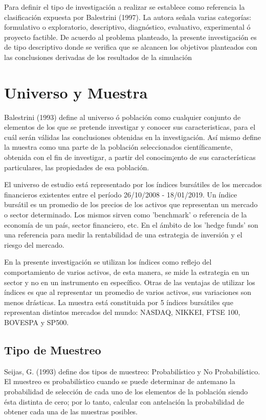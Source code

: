 \documentclass[a4paper,12pt]{Latex/Classes/PhDthesisPSnPDF}
\begin{document}
Para definir el tipo de investigación a realizar se establece como referencia la clasificación expuesta por Balestrini (1997). La autora señala varias categorías: formulativo o exploratorio, descriptivo, diagnóstico, evaluativo, experimental ó proyecto factible. De acuerdo al problema planteado, la presente investigación es de tipo descriptivo donde se verifica que se alcancen los objetivos planteados con las conclusiones derivadas de los resultados de la simulación

\section{Universo y Muestra}

Balestrini (1993) define al universo ó población como cualquier conjunto de elementos de los que se pretende investigar y conocer sus caracteristicas, para el cuál serán válidas las conclusiones obtenidas en la investigación. Así mismo define la muestra como una parte de la población seleccionados científicamente, obtenida con el fin de investigar, a partir del conocim¡ento de sus características particulares, las propiedades de esa población.

El universo de estudio está representado por los índices bursátiles de los mercados financieros existentes entre el período 26/10/2008 - 18/01/2019. Un índice bursátil es un promedio de los precios de los activos que representan un mercado o sector determinado. Los mismos sirven como 'benchmark' o referencia de la economía de un país, sector financiero, etc. En el ámbito de los 'hedge funds' son una referencia para medir la rentabilidad de una estrategia de inversión y el riesgo del mercado.

En la presente investigación se utilizan los índices como reflejo del comportamiento de varios activos, de esta manera, se mide la estrategia en un sector y no en un instrumento en específico. Otras de las ventajas de utilizar los índices es que al representar un promedio de varios activos, sus variaciones son menos drásticas. La muestra está constituida por 5 índices bursátiles que representan distintos mercados del mundo: NASDAQ, NIKKEI, FTSE 100, BOVESPA y SP500.


\subsection{Tipo de Muestreo}

Seijas, G. (1993) define dos tipos de muestreo: Probabilístico y No Probabilístico.  El muestreo es probabilístico cuando se puede determinar de antemano la probabilidad de selección de cada uno de los elementos de la población siendo ésta distinta de cero; por lo tanto, calcular con antelación la probabilidad de obtener cada una de las muestras posibles.
\end{document}
